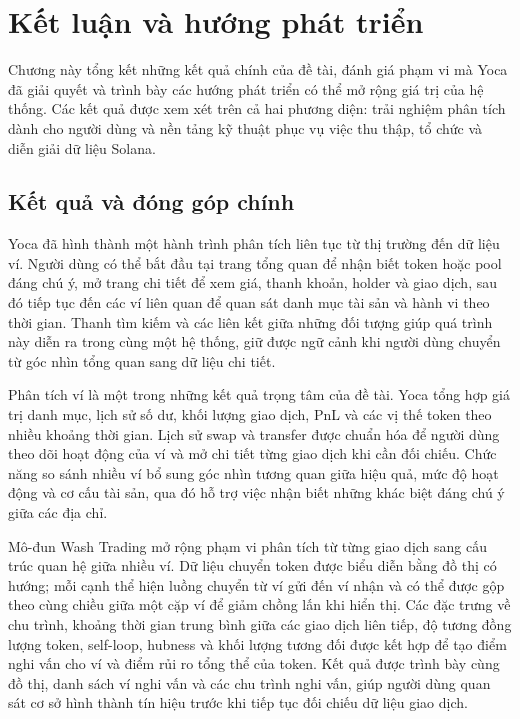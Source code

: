 \chapter{Kết luận và hướng phát triển}
\label{Chapter6}

Chương này tổng kết những kết quả chính của đề tài, đánh giá phạm vi mà Yoca đã giải quyết và trình bày các hướng phát triển có thể mở rộng giá trị của hệ thống. Các kết quả được xem xét trên cả hai phương diện: trải nghiệm phân tích dành cho người dùng và nền tảng kỹ thuật phục vụ việc thu thập, tổ chức và diễn giải dữ liệu Solana.

\section{Kết quả và đóng góp chính}

Yoca đã hình thành một hành trình phân tích liên tục từ thị trường đến dữ liệu ví. Người dùng có thể bắt đầu tại trang tổng quan để nhận biết token hoặc pool đáng chú ý, mở trang chi tiết để xem giá, thanh khoản, holder và giao dịch, sau đó tiếp tục đến các ví liên quan để quan sát danh mục tài sản và hành vi theo thời gian. Thanh tìm kiếm và các liên kết giữa những đối tượng giúp quá trình này diễn ra trong cùng một hệ thống, giữ được ngữ cảnh khi người dùng chuyển từ góc nhìn tổng quan sang dữ liệu chi tiết.

Phân tích ví là một trong những kết quả trọng tâm của đề tài. Yoca tổng hợp giá trị danh mục, lịch sử số dư, khối lượng giao dịch, PnL và các vị thế token theo nhiều khoảng thời gian. Lịch sử swap và transfer được chuẩn hóa để người dùng theo dõi hoạt động của ví và mở chi tiết từng giao dịch khi cần đối chiếu. Chức năng so sánh nhiều ví bổ sung góc nhìn tương quan giữa hiệu quả, mức độ hoạt động và cơ cấu tài sản, qua đó hỗ trợ việc nhận biết những khác biệt đáng chú ý giữa các địa chỉ.

Mô-đun Wash Trading mở rộng phạm vi phân tích từ từng giao dịch sang cấu trúc quan hệ giữa nhiều ví. Dữ liệu chuyển token được biểu diễn bằng đồ thị có hướng; mỗi cạnh thể hiện luồng chuyển từ ví gửi đến ví nhận và có thể được gộp theo cùng chiều giữa một cặp ví để giảm chồng lấn khi hiển thị. Các đặc trưng về chu trình, khoảng thời gian trung bình giữa các giao dịch liên tiếp, độ tương đồng lượng token, self-loop, hubness và khối lượng tương đối được kết hợp để tạo điểm nghi vấn cho ví và điểm rủi ro tổng thể của token. Kết quả được trình bày cùng đồ thị, danh sách ví nghi vấn và các chu trình nghi vấn, giúp người dùng quan sát cơ sở hình thành tín hiệu trước khi tiếp tục đối chiếu dữ liệu giao dịch.

